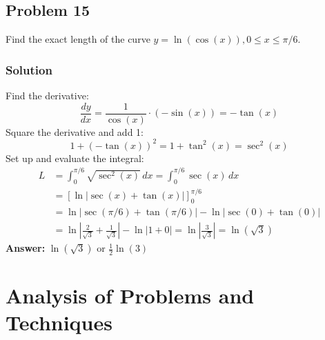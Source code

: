 \documentclass{article}
\begin{document}
\subsection{Problem 15}
Find the exact length of the curve $ y = \ln(\cos(x)), 0 \le x \le \pi/6 $.
\subsubsection*{Solution}
Find the derivative:
\[ \frac{dy}{dx} = \frac{1}{\cos(x)} \cdot (-\sin(x)) = -\tan(x) \]
Square the derivative and add 1:
\[ 1 + (-\tan(x))^2 = 1 + \tan^2(x) = \sec^2(x) \]
Set up and evaluate the integral:
\begin{align*}
    L &= \int_{0}^{\pi/6} \sqrt{\sec^2(x)} \,dx = \int_{0}^{\pi/6} \sec(x) \,dx \\
    &= [\ln|\sec(x)+\tan(x)|]_{0}^{\pi/6} \\
    &= \ln|\sec(\pi/6)+\tan(\pi/6)| - \ln|\sec(0)+\tan(0)| \\
    &= \ln\left|\frac{2}{\sqrt{3}}+\frac{1}{\sqrt{3}}\right| - \ln|1+0| = \ln\left|\frac{3}{\sqrt{3}}\right| = \ln(\sqrt{3})
\end{align*}
\textbf{Answer:} $ \ln(\sqrt{3}) $ or $ \frac{1}{2}\ln(3) $

\section{Analysis of Problems and Techniques}
\end{document}
